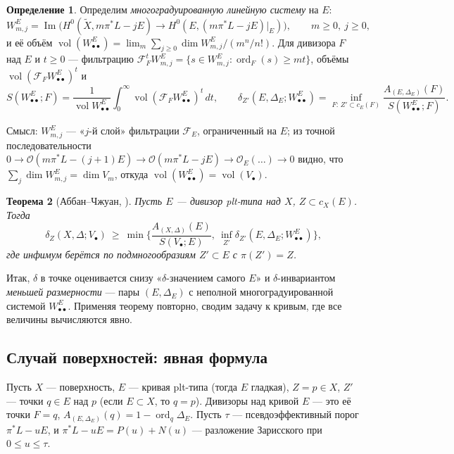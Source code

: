 \documentclass[11pt,a4paper]{article}
\theoremstyle{plain}
\newtheorem{theorem}{Теорема}[section]
\theoremstyle{definition}
\newtheorem{definition}[theorem]{Определение}
\theoremstyle{remark}
\newcommand{\cO}{\mathcal{O}}
\DeclareMathOperator{\ord}{ord}
\DeclareMathOperator{\im}{Im}
\DeclareMathOperator{\vol}{vol}
\begin{document}
\begin{definition}\label{def:refined-series}
Определим \emph{многоградуированную линейную систему} на $E$:
\[
W^E_{m,j}=\im\Big(H^0(\tilde X,m\pi^*L-jE)\to H^0(E,(m\pi^*L-jE)|_E)\Big),\qquad m\ge0,\ j\ge0,
\]
и её объём $\vol(W^E_{\bullet\bullet})=\lim_m\sum_{j\ge0}\dim W^E_{m,j}/(m^n/n!)$. Для дивизора $F$ над
$E$ и $t\ge0$ --- фильтрацию $\mathcal F_F^tW^E_{m,j}=\{s\in W^E_{m,j}:\ord_F(s)\ge mt\}$, объёмы
$\vol(\mathcal F_FW^E_{\bullet\bullet})^t$ и
\[
S(W^E_{\bullet\bullet};F)=\frac1{\vol W^E_{\bullet\bullet}}\int_0^\infty\vol(\mathcal F_FW^E_{\bullet\bullet})^t\,dt,\qquad
\delta_{Z'}(E,\Delta_E;W^E_{\bullet\bullet})=\inf_{F:\,Z'\subset c_E(F)}\frac{A_{(E,\Delta_E)}(F)}{S(W^E_{\bullet\bullet};F)} .
\]
\end{definition}

Смысл: $W^E_{m,j}$ --- «$j$-й слой» фильтрации $\mathcal F_E$, ограниченный на $E$; из точной
последовательности $0\to\cO(m\pi^*L-(j+1)E)\to\cO(m\pi^*L-jE)\to\cO_E(\dots)\to0$ видно, что
$\sum_j\dim W^E_{m,j}=\dim V_m$, откуда $\vol(W^E_{\bullet\bullet})=\vol(V_\bullet)$.

\begin{theorem}[{Аббан--Чжуан, \cite[3.2]{AZ}}]\label{thm:AZ}
Пусть $E$ --- дивизор plt-типа над $X$, $Z\subset c_X(E)$. Тогда
\[
\delta_Z(X,\Delta;V_\bullet)\ \ge\ \min\Big\{\frac{A_{(X,\Delta)}(E)}{S(V_\bullet;E)},\ \inf_{Z'}\delta_{Z'}(E,\Delta_E;W^E_{\bullet\bullet})\Big\},
\]
где инфимум берётся по подмногообразиям $Z'\subset E$ с $\pi(Z')=Z$.
\end{theorem}

Итак, $\delta$ в точке оценивается снизу «$\delta$-значением самого $E$» и $\delta$-инвариантом
\emph{меньшей размерности} --- пары $(E,\Delta_E)$ с неполной многоградуированной системой
$W^E_{\bullet\bullet}$. Применяя теорему повторно, сводим задачу к кривым, где все величины вычисляются явно.

\subsection{Случай поверхностей: явная формула}

Пусть $X$ --- поверхность, $E$ --- кривая plt-типа (тогда $E$ гладкая), $Z=p\in X$, $Z'$ --- точки
$q\in E$ над $p$ (если $E\subset X$, то $q=p$). Дивизоры над кривой $E$ --- это её точки $F=q$,
$A_{(E,\Delta_E)}(q)=1-\ord_q\Delta_E$. Пусть $\tau$ --- псевдоэффективный порог
$\pi^*L-uE$, и $\pi^*L-uE=P(u)+N(u)$ --- разложение Зарисского при $0\le u\le\tau$.
\end{document}
